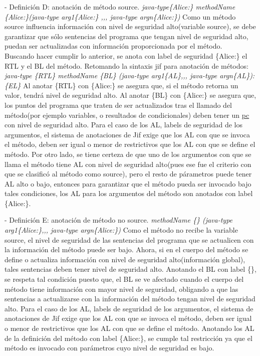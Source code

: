 - Definición D: anotación de método source.\newline 
\emph{java-type\{Alice:\}  methodName \{Alice:\}(java-type arg1\{Alice:\} ,,,
java-type argn\{Alice:\})}
Como un método source influencia información con nivel de seguridad alto(variable
source), se debe garantizar que sólo sentencias del programa que tengan nivel de
seguridad alto, puedan ser actualizadas con información proporcionada por el método.\\
Buscando hacer cumplir lo anterior, se anota con label de
seguridad \{Alice:\} el RTL y el BL del método.
Retomando la sintaxis jif para anotación de métodos:\newline 
\emph{java-type \{RTL\} methodName \{BL\} (java-type arg1\{AL\},,, java-type argn\{AL\}):\{EL\} }\newline
Al anotar \{RTL\} con \{Alice:\} se asegura que, si el método retorna un valor,
tendrá nivel de seguridad alto.\newline
Al anotar \{BL\} con \{Alice:\} se asegura que, los puntos del programa que
traten de ser actualizados tras el llamado del método(por ejemplo variables, o
resultados de condicionales) deben tener un \underline{pc} con nivel de
seguridad alto.\newline
Para el caso de los AL, labels de seguridad de los argumentos, el sistema de
anotaciones de Jif exige que los AL con que se invoca el método, deben ser igual
o menor de restrictivos que los AL con que se define el método. 
Por otro lado, se tiene certeza de que uno de los argumentos con que se llama el
método tiene AL con nivel de seguridad alto(pues ese fue el criterio con que
se clasificó al método como source), pero el resto de párametros puede tener AL
alto o bajo, entonces para garantizar que el método pueda ser invocado bajo
tales condiciones, los AL para los argumentos del método son anotados con
label \{Alice:\}.

- Definición E: anotación de método no source.\newline
\emph{methodName \{\} (java-type arg1\{Alice:\},,, java-type argn\{Alice:\})}\newline
Como el método no recibe la variable source, el nivel de seguridad de las
sentencias del programa que se actualicen con la información del método puede
ser bajo. Ahora,  si en el cuerpo del método se define o actualiza información
con nivel de seguridad alto(información global), tales sentencias deben tener
nivel de seguridad alto.
Anotando el BL con label {\{\}}, se respeta tal condición puesto que,
el BL se ve afectado cuando el cuerpo del método tiene información con mayor
nivel de seguridad, obligando a que las sentencias a actualizarse con la
información del método tengan nivel de seguridad alto.\newline
Para el caso de los AL, labels de seguridad de los argumentos, el sistema de
anotaciones de Jif exige que los AL con que se invoca el método, deben ser igual
o menor de restrictivos que los AL con que se define el método. Anotando los AL
de la definición del método con label \{Alice:\}, se cumple tal restricción ya
que el método es invocado con parámetros cuyo nivel de seguridad es bajo.

